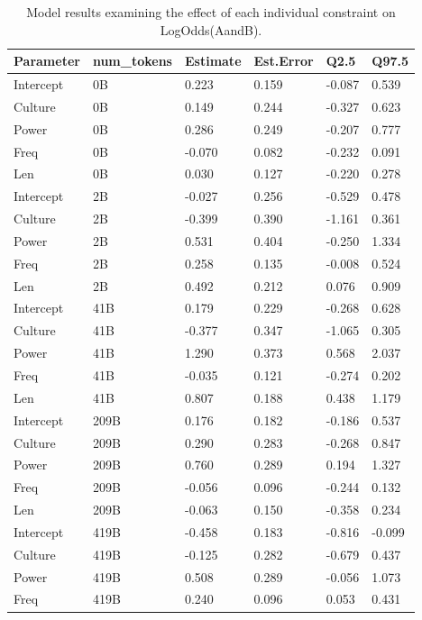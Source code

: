 \documentclass[
  10pt,
  nohyperref]{acl}
\begin{document}
\begin{longtable}[]{@{}llllll@{}}

\caption{\label{tbl-exp2m2}Model results examining the effect of each
individual constraint on LogOdds(AandB).}

\tabularnewline

\toprule\noalign{}
Parameter & num\_tokens & Estimate & Est.Error & Q2.5 & Q97.5 \\
\midrule\noalign{}
\endhead
\bottomrule\noalign{}
\endlastfoot
Intercept & 0B & 0.223 & 0.159 & -0.087 & 0.539 \\
Culture & 0B & 0.149 & 0.244 & -0.327 & 0.623 \\
Power & 0B & 0.286 & 0.249 & -0.207 & 0.777 \\
Freq & 0B & -0.070 & 0.082 & -0.232 & 0.091 \\
Len & 0B & 0.030 & 0.127 & -0.220 & 0.278 \\
Intercept & 2B & -0.027 & 0.256 & -0.529 & 0.478 \\
Culture & 2B & -0.399 & 0.390 & -1.161 & 0.361 \\
Power & 2B & 0.531 & 0.404 & -0.250 & 1.334 \\
Freq & 2B & 0.258 & 0.135 & -0.008 & 0.524 \\
Len & 2B & 0.492 & 0.212 & 0.076 & 0.909 \\
Intercept & 41B & 0.179 & 0.229 & -0.268 & 0.628 \\
Culture & 41B & -0.377 & 0.347 & -1.065 & 0.305 \\
Power & 41B & 1.290 & 0.373 & 0.568 & 2.037 \\
Freq & 41B & -0.035 & 0.121 & -0.274 & 0.202 \\
Len & 41B & 0.807 & 0.188 & 0.438 & 1.179 \\
Intercept & 209B & 0.176 & 0.182 & -0.186 & 0.537 \\
Culture & 209B & 0.290 & 0.283 & -0.268 & 0.847 \\
Power & 209B & 0.760 & 0.289 & 0.194 & 1.327 \\
Freq & 209B & -0.056 & 0.096 & -0.244 & 0.132 \\
Len & 209B & -0.063 & 0.150 & -0.358 & 0.234 \\
Intercept & 419B & -0.458 & 0.183 & -0.816 & -0.099 \\
Culture & 419B & -0.125 & 0.282 & -0.679 & 0.437 \\
Power & 419B & 0.508 & 0.289 & -0.056 & 1.073 \\
Freq & 419B & 0.240 & 0.096 & 0.053 & 0.431 \\

\end{longtable}
\end{document}
